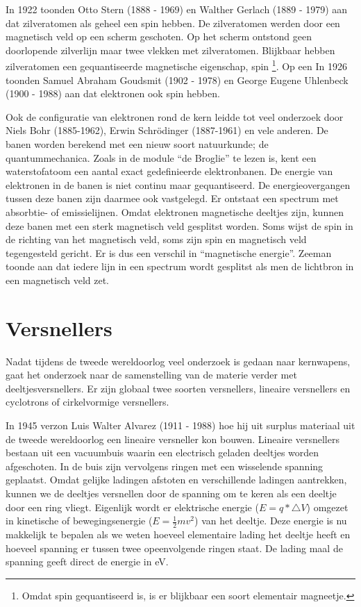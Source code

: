 In 1922 toonden Otto Stern (1888 - 1969) en Walther Gerlach (1889
- 1979) aan dat zilveratomen als geheel een spin hebben. De zilveratomen
werden door een magnetisch veld op een scherm geschoten. Op het scherm
ontstond geen doorlopende zilverlijn maar twee vlekken met zilveratomen.
Blijkbaar hebben zilveratomen een gequantiseerde magnetische eigenschap,
spin \footnote{Omdat spin gequantiseerd is, is er blijkbaar een soort elementair
magneetje.}. Op een In 1926 toonden Samuel Abraham Goudsmit (1902 - 1978) en
George Eugene Uhlenbeck (1900 - 1988) aan dat elektronen ook spin
hebben.

Ook de configuratie van elektronen rond de kern leidde tot veel onderzoek
door Niels Bohr (1885-1962), Erwin Schrödinger (1887-1961) en vele
anderen. De banen worden berekend met een nieuw soort natuurkunde;
de quantummechanica. Zoals in de module ``de Broglie'' te lezen
is, kent een waterstofatoom een aantal exact gedefinieerde elektronbanen.
De energie van elektronen in de banen is niet continu maar gequantiseerd.
De energieovergangen tussen deze banen zijn daarmee ook vastgelegd.
Er ontstaat een spectrum met absorbtie- of emissielijnen. Omdat elektronen
magnetische deeltjes zijn, kunnen deze banen met een sterk magnetisch
veld gesplitst worden. Soms wijst de spin in de richting van het magnetisch
veld, soms zijn spin en magnetisch veld tegengesteld gericht. Er is
dus een verschil in ``magnetische energie''. Zeeman toonde aan dat
iedere lijn in een spectrum wordt gesplitst als men de lichtbron in
een magnetisch veld zet. 


\section{Versnellers}

Nadat tijdens de tweede wereldoorlog veel onderzoek is gedaan naar
kernwapens, gaat het onderzoek naar de samenstelling van de materie
verder met deeltjesversnellers. Er zijn globaal twee soorten versnellers,
lineaire versnellers en cyclotrons of cirkelvormige versnellers.

In 1945 verzon Luis Walter Alvarez (1911 - 1988) hoe hij uit surplus
materiaal uit de tweede wereldoorlog een lineaire versneller kon bouwen.
Lineaire versnellers bestaan uit een vacuumbuis waarin een electrisch
geladen deeltjes worden afgeschoten. In de buis zijn vervolgens ringen
met een wisselende spanning geplaatst. Omdat gelijke ladingen afstoten
en verschillende ladingen aantrekken, kunnen we de deeltjes versnellen
door de spanning om te keren als een deeltje door een ring vliegt.
Eigenlijk wordt er elektrische energie ($E=q*\triangle V$) omgezet
in kinetische of bewegingsenergie ($E=\frac{1}{2}mv^{2}$) van het
deeltje. Deze energie is nu makkelijk te bepalen als we weten hoeveel
elementaire lading het deeltje heeft en hoeveel spanning er tussen
twee opeenvolgende ringen staat. De lading maal de spanning geeft
direct de energie in eV.

